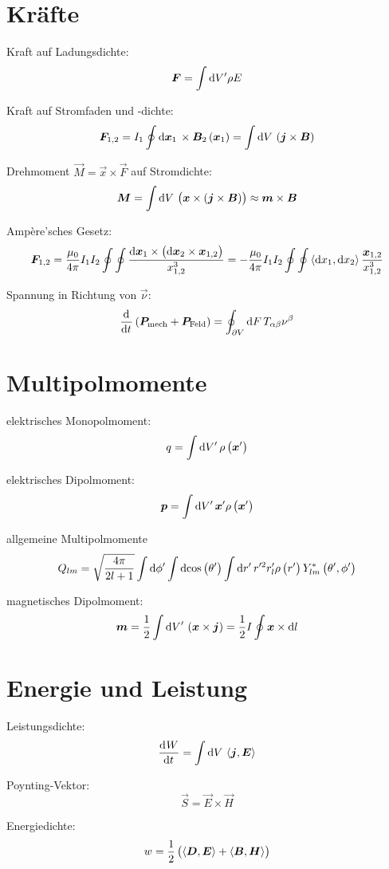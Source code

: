 \section{Kräfte}

Kraft auf Ladungsdichte:
\[
	\vec F
	= \int \dif{V'} \rho E
\]

Kraft auf Stromfaden und -dichte:
\[
	\vec F_{1,2}
	= I_1 \oint \dif{\vec x_1} \, \times \vec B_2\del{\vec x_1}
	= \int \dif{V} \, \del{\vec j \times \vec B}
\]

Drehmoment $\vec M = \vec x \times \vec F$ auf Stromdichte:
\[
	\vec M
	= \int \dif{V} \, \del{\vec x \times \del{\vec j \times \vec B}}
	\approx \vec m \times \vec B
\]

Ampère'sches Gesetz:
\[
	\vec F_{1,2}
	= \frac{\mu_0}{4 \pi} I_1 I_2 \oint \oint \frac{\dif \vec x_1 \times \del{\dif \vec x_2 \times \vec x_{1,2}}}{x_{1,2}^3}
	= - \frac{\mu_0}{4 \pi} I_1 I_2 \oint \oint \inner{\dif x_1}{\dif x_2} \frac{\vec x_{1,2}}{x_{1,2}^3}
\]

Spannung in Richtung von $\vec \nu$:
\[
	\dod{}t \del{\vec P_\text{mech} + \vec P_\text{Feld}}
	=
	\oint_{\partial V} \dif F \, T_{\alpha\beta} \nu^\beta
\]

\section{Multipolmomente}

elektrisches Monopolmoment:
\[
	q
	= \int \dif{V'} \, \rho\del{\vec x'}
\]

elektrisches Dipolmoment:
\[
	\vec p
	= \int \dif{V'} \, \vec x' \rho\del{\vec x'}
\]

allgemeine Multipolmomente
\[
	Q_{lm}
	=
	\sqrt{\frac{4\pi}{2l+1}}
	\int \dif{\phi'}
	\int \dif{\cos\del{\theta'}}
	\int \dif{r'}
	\,
	r'^2 r'_l \rho\del{r'}
	Y^*_{lm} \del{\theta', \phi'}
\]

magnetisches Dipolmoment:
\[
	\vec m
	= \half \int \dif{V'} \, \del{\vec x \times \vec j}
	= \half I \oint \vec x \times \dif l
\]

\section{Energie und Leistung}

Leistungsdichte:
\[
	\dod Wt = \int \dif V \, \inner{\vec j}{\vec E}
\]

Poynting-Vektor:
\[
	\vec S = \vec E \times \vec H
\]

Energiedichte:
\[
	w = \half \del{\inner{\vec D}{\vec E} + \inner{\vec B}{\vec H}}
\]

